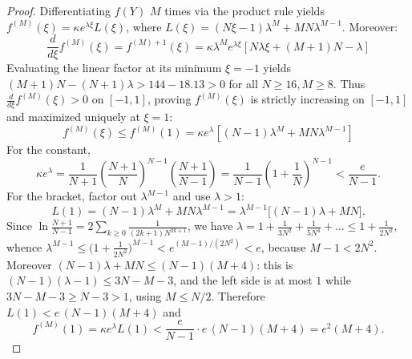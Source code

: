 \documentclass[10pt,a4paper]{amsart}
\begin{document}
\begin{proof}
Differentiating $f(Y)$ $M$ times via the product rule yields $f^{(M)}(\xi) = \kappa e^{\lambda \xi} L(\xi)$, where $L(\xi) = (N\xi - 1)\lambda^M + M N \lambda^{M-1}$. Moreover:
\[
\frac{d}{d\xi} f^{(M)}(\xi) = f^{(M)+1}(\xi) =\kappa \lambda^M e^{\lambda \xi} \left[ N\lambda \xi + (M+1)N - \lambda \right]
\]
Evaluating the linear factor at its minimum $\xi = -1$ yields $(M+1)N - (N+1)\lambda > 144 - 18.13 > 0$ for all $N \ge 16, M \ge 8$. Thus $\frac{d}{d\xi} f^{(M)}(\xi) > 0$ on $[-1, 1]$, proving $f^{(M)}(\xi)$ is strictly increasing on $[-1, 1]$ and maximized uniquely at $\xi = 1$:
\[
f^{(M)}(\xi) \le f^{(M)}(1) = \kappa e^\lambda \left[ (N - 1)\lambda^M + M N \lambda^{M-1} \right]
\]
For the constant,
\[
\kappa e^\lambda = \frac{1}{N+1}\left(\frac{N+1}{N}\right)^{N-1}\left(\frac{N+1}{N-1}\right) = \frac{1}{N-1}\left(1 + \frac{1}{N}\right)^{N-1} < \frac{e}{N-1}.
\]
For the bracket, factor out $\lambda^{M-1}$ and use $\lambda>1$:
\[
L(1) = (N-1)\lambda^{M} + MN\lambda^{M-1}
 = \lambda^{M-1}\bigl[(N-1)\lambda + MN\bigr] .
\]
Since $\ln\frac{N+1}{N-1}=2\sum_{k\ge0}\frac{1}{(2k+1)N^{2k+1}}$, we have
$\lambda = 1+\frac{1}{3N^{2}}+\frac{1}{5N^{4}}+\dots \le 1+\frac{1}{2N^{2}}$, whence
$\lambda^{M-1}\le\bigl(1+\frac{1}{2N^{2}}\bigr)^{M-1}<e^{(M-1)/(2N^{2})}<e$,
because $M-1<2N^{2}$. Moreover $(N-1)\lambda+MN\le(N-1)(M+4)$: this is
$(N-1)(\lambda-1)\le 3N-M-3$, and the left side is at most $1$ while
$3N-M-3\ge N-3>1$, using $M\le N/2$. Therefore
$L(1) < e\,(N-1)(M+4)$ and
\[
f^{(M)}(1) = \kappa e^{\lambda}L(1) < \frac{e}{N-1}\cdot e\,(N-1)(M+4) = e^{2}(M+4).
\]
\end{proof}
\end{document}
